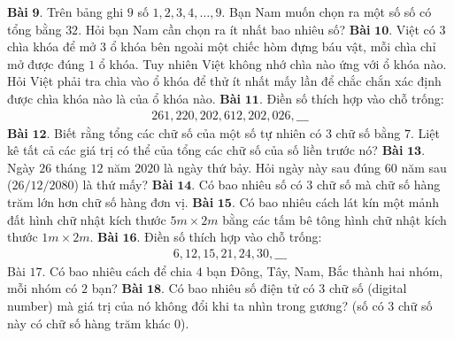 \begin{multicols}{2}
	\begin{figure}[H]
		\centering
		\vspace*{-5pt}
		\captionsetup{labelformat= empty, justification=centering}
		\vspace*{-10pt}
	\end{figure}
	\textbf{\color{cackithi}Bài} $\pmb{9.}$ Trên bảng ghi $9$ số $1,2,3,4,\ldots,9$. Bạn Nam muốn chọn ra một số số có tổng bằng $32$. Hỏi bạn Nam cần chọn ra ít nhất bao nhiêu số?
	\vskip 0.1cm
	\textbf{\color{cackithi}Bài} $\pmb{10.}$ Việt có $3$ chìa khóa để mở $3$ ổ khóa bên ngoài một chiếc hòm đựng báu vật, mỗi chìa chỉ mở được đúng $1$ ổ khóa. Tuy nhiên Việt không nhớ chìa nào ứng với ổ khóa nào. Hỏi Việt phải  tra chìa vào ổ khóa để thử ít nhất mấy lần để chắc chắn xác định được chìa khóa nào là của ổ khóa nào.
	\vskip 0.1cm
	\textbf{\color{cackithi}Bài} $\pmb{11.}$ Điền số thích hợp vào chỗ trống:
	\begin{align*}
		261, 220, 202, 612, 202, 026, \_\_\_
	\end{align*}
	\textbf{\color{cackithi}Bài} $\pmb{12.}$ Biết rằng tổng các chữ số của một số tự nhiên có $3$ chữ số bằng $7$. Liệt kê tất cả các giá trị có thể của tổng các chữ số của số liền trước nó? 
	\vskip 0.1cm
	\textbf{\color{cackithi}Bài} $\pmb{13.}$ Ngày $26$ tháng $12$ năm $2020$ là ngày thứ bảy. Hỏi ngày này sau đúng $60$ năm sau ($26/12/2080$) là thứ mấy?
	\vskip 0.1cm
	\textbf{\color{cackithi}Bài} $\pmb{14.}$ Có bao nhiêu số có $3$ chữ số mà chữ số hàng trăm lớn hơn chữ số hàng đơn vị.
	\vskip 0.1cm
	\textbf{\color{cackithi}Bài} $\pmb{15.}$ Có bao nhiêu cách lát kín một mảnh đất hình chữ nhật kích thước $5m\times2m$ bằng các tấm bê tông hình chữ nhật kích thước $1m\times2m$.
	\vskip 0.1cm
	\textbf{\color{cackithi}Bài} $\pmb{16.}$ Điền số thích hợp vào chỗ trống:
	\begin{align*}
		6, 12, 15, 21, 24, 30, \_\_\_
	\end{align*}
	\vskip 0.1cm
	Bài $17$. Có bao nhiêu cách để chia $4$ bạn Đông, Tây, Nam, Bắc thành hai nhóm, mỗi nhóm có $2$ bạn?
	\vskip 0.1cm
	\textbf{\color{cackithi}Bài} $\pmb{18.}$ Có bao nhiêu số điện tử có $3$ chữ số (digital number) mà giá trị của nó không đổi khi ta nhìn trong gương? (số có $3$ chữ số này có chữ số hàng trăm khác $0$).

\end{multicols}
